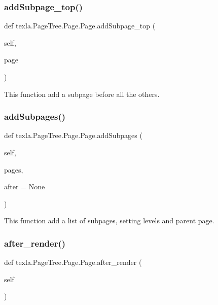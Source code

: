 \subsubsection{\texorpdfstring{add\+Subpage\+\_\+top()}{addSubpage\_top()}}
{\footnotesize\ttfamily def texla.\+Page\+Tree.\+Page.\+Page.\+add\+Subpage\+\_\+top (\begin{DoxyParamCaption}\item[{}]{self,  }\item[{}]{page }\end{DoxyParamCaption})}

\begin{DoxyVerb}This function add a subpage before all the others.\end{DoxyVerb}
 \hypertarget{classtexla_1_1PageTree_1_1Page_1_1Page_a040ae3dde5163b524191b66e91c3f80e}{}\label{classtexla_1_1PageTree_1_1Page_1_1Page_a040ae3dde5163b524191b66e91c3f80e} 
\subsubsection{\texorpdfstring{add\+Subpages()}{addSubpages()}}
{\footnotesize\ttfamily def texla.\+Page\+Tree.\+Page.\+Page.\+add\+Subpages (\begin{DoxyParamCaption}\item[{}]{self,  }\item[{}]{pages,  }\item[{}]{after = {\ttfamily None} }\end{DoxyParamCaption})}

\begin{DoxyVerb}This function add a list of subpages,
setting levels and parent page.\end{DoxyVerb}
 \hypertarget{classtexla_1_1PageTree_1_1Page_1_1Page_a6c12e22fb2a28e4e64678b04f8a6e70c}{}\label{classtexla_1_1PageTree_1_1Page_1_1Page_a6c12e22fb2a28e4e64678b04f8a6e70c} 
\subsubsection{\texorpdfstring{after\+\_\+render()}{after\_render()}}
{\footnotesize\ttfamily def texla.\+Page\+Tree.\+Page.\+Page.\+after\+\_\+render (\begin{DoxyParamCaption}\item[{}]{self }\end{DoxyParamCaption})}

